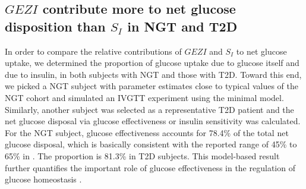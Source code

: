 \documentclass[utf8]{frontiersSCNS} %
\begin{document}
\subsection{$GEZI$ contribute more to net glucose disposition than $S_I$ in NGT and T2D}
In order to compare the relative contributions of $GEZI$ and $S_I$ to net glucose uptake, we determined the proportion of glucose uptake due to glucose itself and due to insulin, in both subjects with NGT and those with T2D. Toward this end, we picked a NGT subject with parameter estimates close to typical values of the NGT cohort and simulated an IVGTT experiment using the minimal model. Similarly, another subject was selected as a representative T2D patient and the net glucose disposal via glucose effectiveness or insulin sensitivity was calculated. For the NGT subject, glucose effectiveness accounts for 78.4\% of the total net glucose disposal, which is basically consistent with the reported range of 45\% to 65\% in \citet{Alford_2018}. The proportion is 81.3\% in T2D subjects. This model-based result further quantifies the important role of glucose effectiveness in the regulation of glucose homeostasis \citep{Dube2015}.
\end{document}
